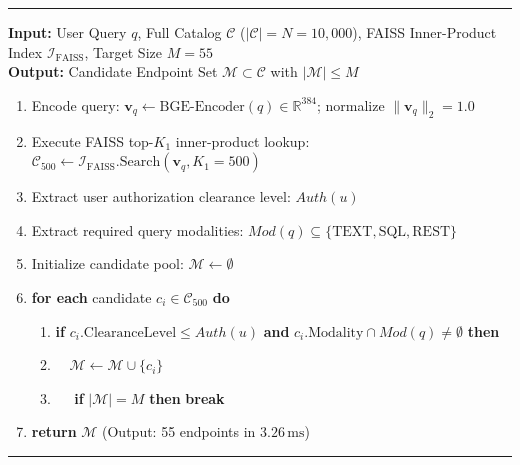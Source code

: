 \documentclass[fleqn,10pt]{article}
\begin{document}
\begin{minipage}{\textwidth}
\vspace{0.5em}
\vspace{0.4em}
\hrule
\vspace{0.4em}
\textbf{Input:} User Query $q$, Full Catalog $\mathcal{C}$ ($|\mathcal{C}| = N = 10{,}000$), FAISS Inner-Product Index $\mathcal{I}_{\text{FAISS}}$, Target Size $M = 55$\\
\textbf{Output:} Candidate Endpoint Set $\mathcal{M} \subset \mathcal{C}$ with $|\mathcal{M}| \le M$
\begin{enumerate}[leftmargin=2em,noitemsep]
    \item Encode query: $\mathbf{v}_q \leftarrow \text{BGE-Encoder}(q) \in \mathbb{R}^{384}$; normalize $\|\mathbf{v}_q\|_2 = 1.0$
    \item Execute FAISS top-$K_1$ inner-product lookup: $\mathcal{C}_{500} \leftarrow \mathcal{I}_{\text{FAISS}}.\text{Search}(\mathbf{v}_q, K_1 = 500)$
    \item Extract user authorization clearance level: $Auth(u)$
    \item Extract required query modalities: $Mod(q) \subseteq \{\text{TEXT}, \text{SQL}, \text{REST}\}$
    \item Initialize candidate pool: $\mathcal{M} \leftarrow \emptyset$
    \item \textbf{for each} candidate $c_i \in \mathcal{C}_{500}$ \textbf{do}
    \begin{enumerate}[leftmargin=1.5em,noitemsep]
        \item \textbf{if} $c_i.\text{ClearanceLevel} \le Auth(u)$ \textbf{and} $c_i.\text{Modality} \cap Mod(q) \neq \emptyset$ \textbf{then}
        \item $\quad \mathcal{M} \leftarrow \mathcal{M} \cup \{c_i\}$
        \item $\quad$ \textbf{if} $|\mathcal{M}| = M$ \textbf{then} \textbf{break}
    \end{enumerate}
    \item \textbf{return} $\mathcal{M}$ (Output: 55 endpoints in $3.26\,\text{ms}$)
\end{enumerate}
\vspace{0.4em}
\hrule
\vspace{1.2em}
\end{minipage}
\end{document}
